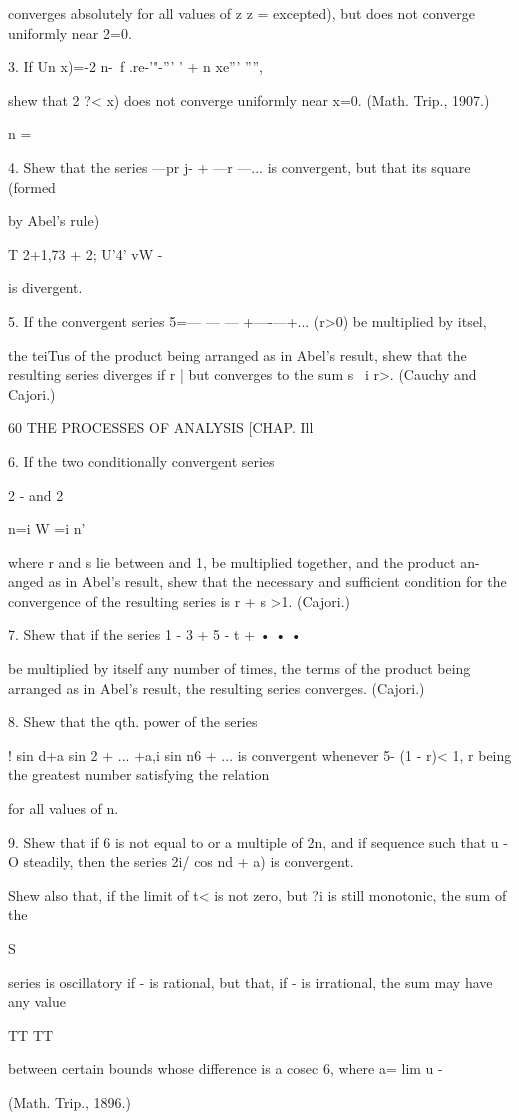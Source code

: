 converges absolutely for all values of z  z = excepted), but does not converge uniformly 
near 2=0. 

3. If Un  x)=-2 n-\ f .re-'"-''' ' +  n xe''' '''', 

shew that 2 ?<   x) does not converge uniformly near x=0. (Math. Trip., 1907.) 

n = \ 

4. Shew that the series —pr j- + —r —... is convergent, but that its square (formed 

by Abel's rule) 

T  2+1,73 + 2; U'4' vW - 

is divergent. 

5. If the convergent series 5=— — — +—-—+... (r>0) be multiplied by itsel, 

the teiTus of the product being arranged as in Abel's result, shew that the resulting series 
diverges if r  | but converges to the sum s  \ i r>.  (Cauchy and Cajori.) 



60 THE PROCESSES OF ANALYSIS [CHAP. Ill 

6. If the two conditionally convergent series 

2   -   and 2     



n=i W   =i n' 

where r and s lie between and 1, be multiplied together, and the product an-anged as in 
Abel's result, shew that the necessary and sufficient condition for the convergence of the 
resulting series is r + s >1. (Cajori.) 

7. Shew that if the series 1 - 3 + 5 - t + • • • 

be multiplied by itself any number of times, the terms of the product being arranged as 
in Abel's result, the resulting series converges. (Cajori.) 

8. Shew that the qth. power of the series 

 ! sin d+a  sin 2  + ... +a,i sin n6 + ... 
is convergent whenever 5- (1 - r)< 1, r being the greatest number satisfying the relation 

for all values of n. 

9. Shew that if 6 is not equal to or a multiple of 2n, and if %
sequence such that u - O steadily, then the series 2i/  cos  nd + a) is convergent. 

Shew also that, if the limit of t<  is not zero, but ?i  is still monotonic, the sum of the 

S 

series is oscillatory if - is rational, but that, if - is irrational, the sum may have any value 

TT TT 

between certain bounds whose difference is a cosec  6, where a= lim u - 

(Math. Trip., 1896.) 

